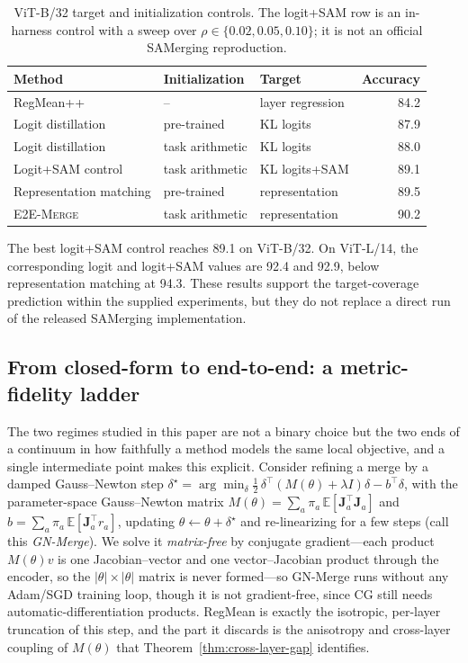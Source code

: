 \documentclass[letterpaper]{article} %
\newcommand{\method}{\textup{\textsc{E2E-Merge}}\xspace}
\theoremstyle{plain}
\theoremstyle{definition}
\begin{document}
\begin{table}[tb]
\centering
{\small
\begin{tabular}{lllr}
\toprule
Method & Initialization & Target & Accuracy \\
\midrule
RegMean++ & -- & layer regression & 84.2 \\
Logit distillation & pre-trained & KL logits & 87.9 \\
Logit distillation & task arithmetic & KL logits & 88.0 \\
Logit+SAM control & task arithmetic & KL logits+SAM & 89.1 \\
Representation matching & pre-trained & representation & 89.5 \\
\method & task arithmetic & representation & 90.2 \\
\bottomrule
\end{tabular}
}
\caption{ViT-B/32 target and initialization controls. The logit+SAM row is an in-harness
control with a sweep over $\rho\in\{0.02,0.05,0.10\}$; it is not an official SAMerging reproduction.}
\label{tab:distillation-control}
\end{table}

The best logit+SAM control reaches 89.1 on ViT-B/32.
On ViT-L/14, the corresponding logit and logit+SAM values are 92.4 and 92.9, below representation matching at 94.3.
These results support the target-coverage prediction within the supplied experiments, but they do not replace a direct run of the released SAMerging implementation.

\subsection{From closed-form to end-to-end: a metric-fidelity ladder}
\label{app:gnladder}
The two regimes studied in this paper are not a binary choice but the two ends of a continuum in how faithfully a method models the same local objective, and a single intermediate point makes this explicit.
Consider refining a merge by a damped Gauss--Newton step $\delta^\star=\arg\min_\delta \tfrac12\,\delta^\top(M(\theta)+\lambda I)\delta-b^\top\delta$, with the parameter-space Gauss--Newton matrix $M(\theta)=\sum_a\pi_a\,\mathbb{E}[\mathbf{J}_a^\top \mathbf{J}_a]$ and $b=\sum_a\pi_a\,\mathbb{E}[\mathbf{J}_a^\top r_a]$, updating $\theta\!\leftarrow\!\theta+\delta^\star$ and re-linearizing for a few steps (call this \emph{GN-Merge}).
We solve it \emph{matrix-free} by conjugate gradient---each product $M(\theta)v$ is one Jacobian--vector and one vector--Jacobian product through the encoder, so the $|\theta|\times|\theta|$ matrix is never formed---so GN-Merge runs without any Adam/SGD training loop, though it is not gradient-free, since CG still needs automatic-differentiation products.
RegMean is exactly the isotropic, per-layer truncation of this step, and the part it discards is the anisotropy and cross-layer coupling of $M(\theta)$ that Theorem~\ref{thm:cross-layer-gap} identifies.
\end{document}
